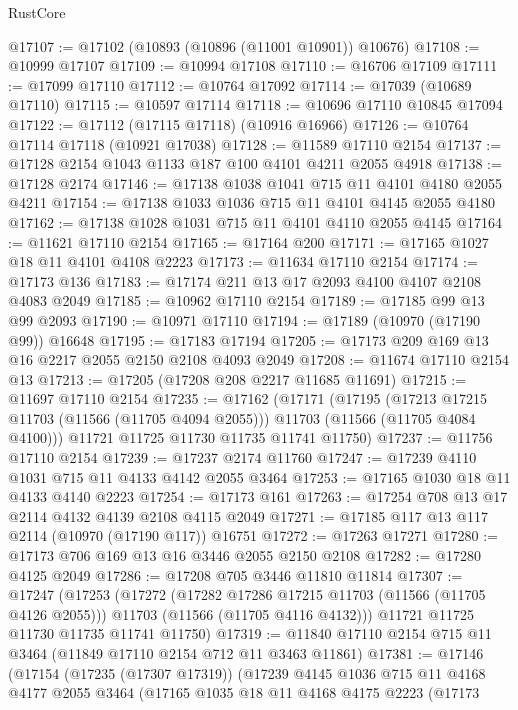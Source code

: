 \begin{lexlean}{RustCore}
\begin{coremodule}
@17107 := @17102 (@10893 (@10896 (@11001 @10901)) @10676)
@17108 := @10999 @17107
@17109 := @10994 @17108
@17110 := @16706 @17109
@17111 := @17099 @17110
@17112 := @10764 @17092
@17114 := @17039 (@10689 @17110)
@17115 := @10597 @17114
@17118 := @10696 @17110 @10845 @17094
@17122 := @17112 (@17115 @17118) (@10916 @16966)
@17126 := @10764 @17114 @17118 (@10921 @17038)
@17128 := @11589 @17110 @2154
@17137 := @17128 @2154 @1043 @1133 @187 @100 @4101 @4211 @2055 @4918
@17138 := @17128 @2174
@17146 := @17138 @1038 @1041 @715 @11 @4101 @4180 @2055 @4211
@17154 := @17138 @1033 @1036 @715 @11 @4101 @4145 @2055 @4180
@17162 := @17138 @1028 @1031 @715 @11 @4101 @4110 @2055 @4145
@17164 := @11621 @17110 @2154
@17165 := @17164 @200
@17171 := @17165 @1027 @18 @11 @4101 @4108 @2223
@17173 := @11634 @17110 @2154
@17174 := @17173 @136
@17183 := @17174 @211 @13 @17 @2093 @4100 @4107 @2108 @4083 @2049
@17185 := @10962 @17110 @2154
@17189 := @17185 @99 @13 @99 @2093
@17190 := @10971 @17110
@17194 := @17189 (@10970 (@17190 @99)) @16648
@17195 := @17183 @17194
@17205 := @17173 @209 @169 @13 @16 @2217 @2055 @2150 @2108 @4093 @2049
@17208 := @11674 @17110 @2154 @13
@17213 := @17205 (@17208 @208 @2217 @11685 @11691)
@17215 := @11697 @17110 @2154
@17235 := @17162
    (@17171
      (@17195
        (@17213 @17215 @11703 (@11566 (@11705 @4094 @2055)))
        @11703
        (@11566 (@11705 @4084 @4100)))
      @11721
      @11725
      @11730
      @11735
      @11741
      @11750)
@17237 := @11756 @17110 @2154
@17239 := @17237 @2174 @11760
@17247 := @17239 @4110 @1031 @715 @11 @4133 @4142 @2055 @3464
@17253 := @17165 @1030 @18 @11 @4133 @4140 @2223
@17254 := @17173 @161
@17263 := @17254 @708 @13 @17 @2114 @4132 @4139 @2108 @4115 @2049
@17271 := @17185 @117 @13 @117 @2114 (@10970 (@17190 @117)) @16751
@17272 := @17263 @17271
@17280 := @17173 @706 @169 @13 @16 @3446 @2055 @2150 @2108
@17282 := @17280 @4125 @2049
@17286 := @17208 @705 @3446 @11810 @11814
@17307 := @17247
    (@17253
      (@17272
        (@17282 @17286 @17215 @11703 (@11566 (@11705 @4126 @2055)))
        @11703
        (@11566 (@11705 @4116 @4132)))
      @11721
      @11725
      @11730
      @11735
      @11741
      @11750)
@17319 := @11840 @17110 @2154 @715 @11 @3464 (@11849 @17110 @2154 @712 @11 @3463 @11861)
@17381 := @17146
    (@17154
      (@17235 (@17307 @17319))
      (@17239
        @4145
        @1036
        @715
        @11
        @4168
        @4177
        @2055
        @3464
        (@17165
          @1035
          @18
          @11
          @4168
          @4175
          @2223
          (@17173

\end{coremodule}
\end{lexlean}
